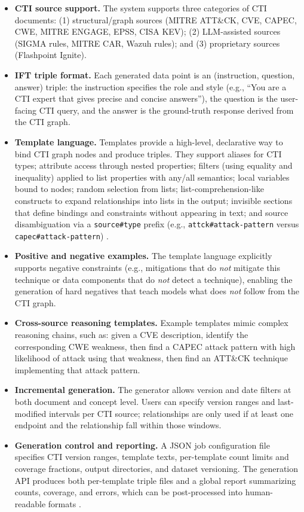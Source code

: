 \documentclass[unnumsec,webpdf,contemporary,large]{oup-authoring-template}
\theoremstyle{thmstyleone}
\theoremstyle{thmstyletwo}
\theoremstyle{thmstylethree}
\begin{document}
\begin{itemize}
  \item \textbf{CTI source support.} The system supports three categories of CTI documents: (1) structural/graph sources (MITRE ATT\&CK, CVE, CAPEC, CWE, MITRE ENGAGE, EPSS, CISA KEV); (2) LLM-assisted sources (SIGMA rules, MITRE CAR, Wazuh rules); and (3) proprietary sources (Flashpoint Ignite).
  \item \textbf{IFT triple format.} Each generated data point is an (instruction, question, answer) triple: the instruction specifies the role and style (e.g., ``You are a CTI expert that gives precise and concise answers''), the question is the user-facing CTI query, and the answer is the ground-truth response derived from the CTI graph.
  \item \textbf{Template language.} Templates provide a high-level, declarative way to bind CTI graph nodes and produce triples. They support aliases for CTI types; attribute access through nested properties; filters (using equality and inequality) applied to list properties with any/all semantics; local variables bound to nodes; random selection from lists; list-comprehension-like constructs to expand relationships into lists in the output; invisible sections that define bindings and constraints without appearing in text; and source disambiguation via a \verb|source#type| prefix (e.g., \verb|attck#attack-pattern| versus \verb|capec#attack-pattern|) \cite{cardei2025ift}.
  \item \textbf{Positive and negative examples.} The template language explicitly supports negative constraints (e.g., mitigations that do \emph{not} mitigate this technique or data components that do \emph{not} detect a technique), enabling the generation of hard negatives that teach models what does \emph{not} follow from the CTI graph.
  \item \textbf{Cross-source reasoning templates.} Example templates mimic complex reasoning chains, such as: given a CVE description, identify the corresponding CWE weakness, then find a CAPEC attack pattern with high likelihood of attack using that weakness, then find an ATT\&CK technique implementing that attack pattern.
  \item \textbf{Incremental generation.} The generator allows version and date filters at both document and concept level. Users can specify version ranges and last-modified intervals per CTI source; relationships are only used if at least one endpoint and the relationship fall within those windows.
  \item \textbf{Generation control and reporting.} A JSON job configuration file specifies CTI version ranges, template texts, per-template count limits and coverage fractions, output directories, and dataset versioning. The generation API produces both per-template triple files and a global report summarizing counts, coverage, and errors, which can be post-processed into human-readable formats \cite{cardei2025ift}.
\end{itemize}
\end{document}
